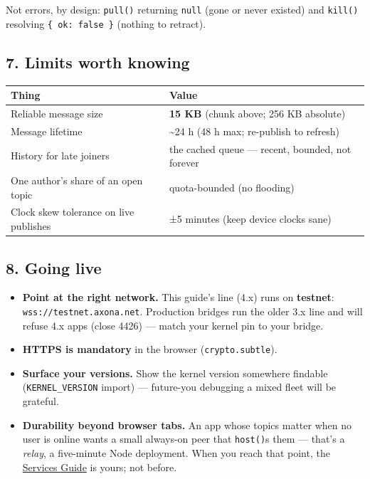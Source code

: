 \documentclass[
  nobib]{tufte-handout}
\newcounter{none} %
\providecommand{\tightlist}{%
  \setlength{\itemsep}{0pt}\setlength{\parskip}{0pt}}
\begin{document}
Not errors, by design: \texttt{pull()} returning \texttt{null} (gone or
never existed) and \texttt{kill()} resolving \texttt{\{\ ok:\ false\ \}}
(nothing to retract).

\subsection{7. Limits worth knowing}\label{limits-worth-knowing}

{\def\LTcaptype{none} %
\begin{longtable}[]{@{}
  >{\raggedright\arraybackslash}p{}
  >{\raggedright\arraybackslash}p{}@{}}
\toprule\noalign{}
\begin{minipage}[b]{\linewidth}\raggedright
Thing
\end{minipage} & \begin{minipage}[b]{\linewidth}\raggedright
Value
\end{minipage} \\
\midrule\noalign{}
\endhead
\bottomrule\noalign{}
\endlastfoot
Reliable message size & \textbf{15 KB} (chunk above; 256 KB absolute) \\
Message lifetime & \textasciitilde24 h (48 h max; re-publish to
refresh) \\
History for late joiners & the cached queue --- recent, bounded, not
forever \\
One author's share of an open topic & quota-bounded (no flooding) \\
Clock skew tolerance on live publishes & ±5 minutes (keep device clocks
sane) \\
\end{longtable}
}

\subsection{8. Going live}\label{going-live}

\begin{itemize}
\tightlist
\item
  \textbf{Point at the right network.} This guide's line (4.x) runs on
  \textbf{testnet}: \texttt{wss://testnet.axona.net}. Production bridges
  run the older 3.x line and will refuse 4.x apps (close 4426) --- match
  your kernel pin to your bridge.
\item
  \textbf{HTTPS is mandatory} in the browser (\texttt{crypto.subtle}).
\item
  \textbf{Surface your versions.} Show the kernel version somewhere
  findable (\texttt{KERNEL\_VERSION} import) --- future-you debugging a
  mixed fleet will be grateful.
\item
  \textbf{Durability beyond browser tabs.} An app whose topics matter
  when no user is online wants a small always-on peer that
  \texttt{host()}s them --- that's a \emph{relay}, a five-minute Node
  deployment. When you reach that point, the
  \href{Axona-Services-Guide-v4.11.2.md}{Services Guide} is yours; not
  before.
\end{itemize}
\end{document}
